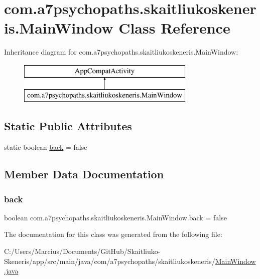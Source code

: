 \hypertarget{classcom_1_1a7psychopaths_1_1skaitliukoskeneris_1_1_main_window}{}\section{com.\+a7psychopaths.\+skaitliukoskeneris.\+Main\+Window Class Reference}
\label{classcom_1_1a7psychopaths_1_1skaitliukoskeneris_1_1_main_window}
Inheritance diagram for com.\+a7psychopaths.\+skaitliukoskeneris.\+Main\+Window\+:\begin{figure}[H]
\begin{center}
\leavevmode
\includegraphics[height=2.000000cm]{classcom_1_1a7psychopaths_1_1skaitliukoskeneris_1_1_main_window}
\end{center}
\end{figure}
\subsection*{Static Public Attributes}
\begin{DoxyCompactItemize}
\item 
static boolean \mbox{\hyperlink{classcom_1_1a7psychopaths_1_1skaitliukoskeneris_1_1_main_window_a65d5fa49b28f464cf06d686baf9e746b}{back}} = false
\end{DoxyCompactItemize}


\subsection{Member Data Documentation}
\mbox{\label{classcom_1_1a7psychopaths_1_1skaitliukoskeneris_1_1_main_window_a65d5fa49b28f464cf06d686baf9e746b}} 
\subsubsection{\texorpdfstring{back}{back}}
{\footnotesize\ttfamily boolean com.\+a7psychopaths.\+skaitliukoskeneris.\+Main\+Window.\+back = false\hspace{0.3cm}{\ttfamily [static]}}



The documentation for this class was generated from the following file\+:\begin{DoxyCompactItemize}
\item 
C\+:/\+Users/\+Marcius/\+Documents/\+Git\+Hub/\+Skaitliuko-\/\+Skeneris/app/src/main/java/com/a7psychopaths/skaitliukoskeneris/\mbox{\hyperlink{_main_window_8java}{Main\+Window.\+java}}\end{DoxyCompactItemize}
